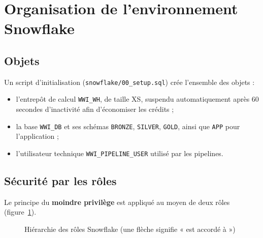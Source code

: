 \section{Organisation de l'environnement Snowflake}

\subsection{Objets}
Un script d'initialisation (\texttt{snowflake/00\_setup.sql}) crée l'ensemble des objets :
\begin{itemize}
  \item l'entrepôt de calcul \texttt{WWI\_WH}, de taille XS, suspendu automatiquement après 60 secondes
        d'inactivité afin d'économiser les crédits ;
  \item la base \texttt{WWI\_DB} et ses schémas \texttt{BRONZE}, \texttt{SILVER}, \texttt{GOLD}, ainsi
        que \texttt{APP} pour l'application ;
  \item l'utilisateur technique \texttt{WWI\_PIPELINE\_USER} utilisé par les pipelines.
\end{itemize}

\subsection{Sécurité par les rôles}
Le principe du \textbf{moindre privilège} est appliqué au moyen de deux rôles (figure~\ref{fig:rbac}).

\begin{figure}[H]
\centering
{}
\caption{Hiérarchie des rôles Snowflake (une flèche signifie « est accordé à »)}
\label{fig:rbac}
\end{figure}

